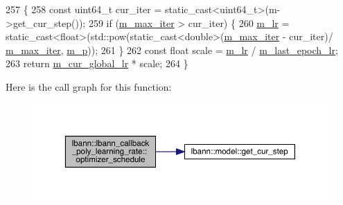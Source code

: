 \begin{DoxyCode}
257                                                                                     \{
258   \textcolor{keyword}{const} uint64\_t cur\_iter = \textcolor{keyword}{static\_cast<}uint64\_t\textcolor{keyword}{>}(m->get\_cur\_step());
259   \textcolor{keywordflow}{if} (\hyperlink{classlbann_1_1lbann__callback__poly__learning__rate_a43c06187577baff885bda6177fe56c3f}{m\_max\_iter} > cur\_iter) \{
260     \hyperlink{classlbann_1_1lbann__callback__poly__learning__rate_a02cb265abba03e10fcba2be3cbbafce4}{m\_lr} = \textcolor{keyword}{static\_cast<}\textcolor{keywordtype}{float}\textcolor{keyword}{>}(std::pow(static\_cast<double>(\hyperlink{classlbann_1_1lbann__callback__poly__learning__rate_a43c06187577baff885bda6177fe56c3f}{m\_max\_iter} - cur\_iter)/
      \hyperlink{classlbann_1_1lbann__callback__poly__learning__rate_a43c06187577baff885bda6177fe56c3f}{m\_max\_iter}, \hyperlink{classlbann_1_1lbann__callback__poly__learning__rate_a03c8c9a738036f9b778f11416112fd80}{m\_p}));
261   \}
262   \textcolor{keyword}{const} \textcolor{keywordtype}{float} scale = \hyperlink{classlbann_1_1lbann__callback__poly__learning__rate_a02cb265abba03e10fcba2be3cbbafce4}{m\_lr} / \hyperlink{classlbann_1_1lbann__callback__poly__learning__rate_aad95c34cfb705392bf38ecbb0dc97b32}{m\_last\_epoch\_lr};
263   \textcolor{keywordflow}{return} \hyperlink{classlbann_1_1lbann__callback__learning__rate_a97194f282c29a748c915d9811a8a99fb}{m\_cur\_global\_lr} * scale;
264 \}
\end{DoxyCode}
Here is the call graph for this function\+:\nopagebreak
\begin{figure}[H]
\begin{center}
\leavevmode
\includegraphics[width=350pt]{classlbann_1_1lbann__callback__poly__learning__rate_a55414af733e519be126572ec92492bf7_cgraph}
\end{center}
\end{figure}
\mbox{\label{classlbann_1_1lbann__callback__poly__learning__rate_a47d3d2a94157f1992bf4a964620208f3}} 
